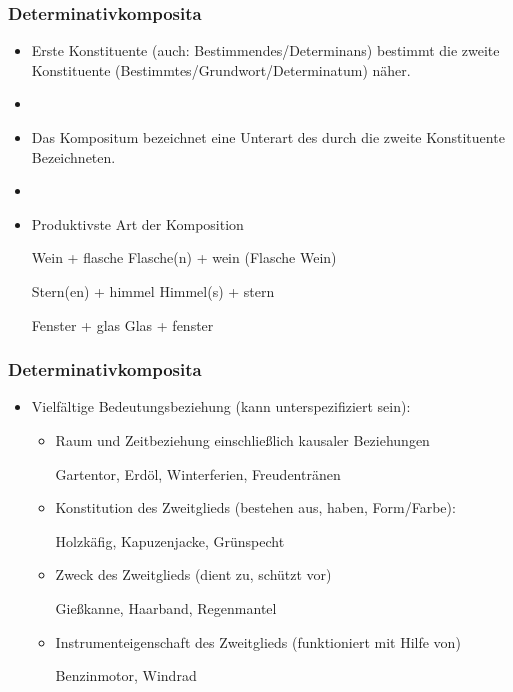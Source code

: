 \begin{frame}
\frametitle{Determinativkomposita}

\begin{itemize}
	\item Erste Konstituente (auch: Bestimmendes/Determinans) bestimmt die zweite Konstituente (Bestimmtes/Grundwort/Determinatum) näher.
	\item[]
	\item Das Kompositum bezeichnet eine Unterart des durch die zweite Konstituente Bezeichneten.
	\item[]
	\item Produktivste Art der Komposition
	
	\ea Wein + flasche \vs Flasche(n) + wein (Flasche \vs Wein)
	\z
	
	\ea Stern(en) + himmel \vs Himmel(s) + stern
	\z
		
	\ea Fenster + glas \vs Glas + fenster
	\z
	
\end{itemize}

\end{frame}


\begin{frame}
\frametitle{Determinativkomposita}

\begin{itemize}
	\item Vielfältige Bedeutungsbeziehung (kann unterspezifiziert sein):
		\begin{itemize}
		
			\item Raum und Zeitbeziehung einschließlich kausaler Beziehungen
			
			\ea Gartentor, Erdöl, Winterferien, Freudentränen
			\z
			
			\item Konstitution des Zweitglieds (bestehen aus, haben, Form/Farbe):
			
			\ea Holzkäfig, Kapuzenjacke, Grünspecht
			\z
			
			\item Zweck des Zweitglieds (dient zu, schützt vor)
			
			\ea Gießkanne, Haarband, Regenmantel
			\z
			
			\item Instrumenteigenschaft des Zweitglieds (funktioniert mit Hilfe von)
			
			\ea Benzinmotor, Windrad
			\z
			
		\end{itemize}
	
\end{itemize}

\end{frame}


